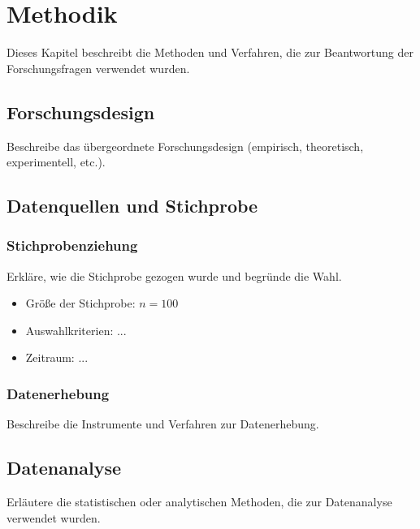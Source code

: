 
\chapter{Methodik}
\label{chap:methodology}

Dieses Kapitel beschreibt die Methoden und Verfahren, die zur Beantwortung
der Forschungsfragen verwendet wurden.

\section{Forschungsdesign}
\label{sec:meth:design}

Beschreibe das übergeordnete Forschungsdesign
(empirisch, theoretisch, experimentell, etc.).

\section{Datenquellen und Stichprobe}
\label{sec:meth:data}

\subsection{Stichprobenziehung}

Erkläre, wie die Stichprobe gezogen wurde und begründe die Wahl.
\begin{itemize}
    \item Größe der Stichprobe: $n = 100$
    \item Auswahlkriterien: ...
    \item Zeitraum: ...
\end{itemize}

\subsection{Datenerhebung}

Beschreibe die Instrumente und Verfahren zur Datenerhebung.

\section{Datenanalyse}
\label{sec:meth:analysis}

Erläutere die statistischen oder analytischen Methoden, die zur
Datenanalyse verwendet wurden.

